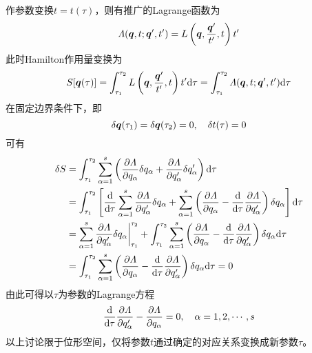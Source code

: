 作参数变换$t = t(\tau)$，则有推广的Lagrange函数为
\begin{equation*}
	\mathnormal{\Lambda} (\boldsymbol{q},t;\boldsymbol{q}',t') = L \left(\boldsymbol{q}, \frac{\boldsymbol{q}'}{t'},t\right) t'
\end{equation*}
此时Hamilton作用量变换为
\begin{equation}
	S[\boldsymbol{q}(\tau)] = \int_{\tau_1}^{\tau_2} L\left(\boldsymbol{q},\frac{\boldsymbol{q}'}{t'},t\right) t' \mathrm{d} \tau = \int_{\tau_1}^{\tau_2} \mathnormal{\Lambda} (\boldsymbol{q},t;\boldsymbol{q}',t') \mathrm{d} \tau
\end{equation}
在固定边界条件下，即
\begin{equation*}
	\delta \boldsymbol{q}(\tau_1) = \delta \boldsymbol{q}(\tau_2) = 0,\quad \delta t(\tau) = 0
\end{equation*}
可有
\begin{align*}
	\delta S & = \int_{\tau_1}^{\tau_2} \sum_{\alpha=1}^s \left(\frac{\partial \mathnormal{\Lambda}}{\partial q_\alpha} \delta q_\alpha + \frac{\partial \mathnormal{\Lambda}}{\partial q'_\alpha} \delta q'_\alpha\right) \mathrm{d} \tau \\
	& = \int_{\tau_1}^{\tau_2} \left[\frac{\mathrm{d}}{\mathrm{d} \tau} \sum_{\alpha=1}^s \frac{\partial \mathnormal{\Lambda}}{\partial q'_\alpha} \delta q_\alpha + \sum_{\alpha=1}^s \left(\frac{\partial \mathnormal{\Lambda}}{\partial q_\alpha} - \frac{\mathrm{d}}{\mathrm{d} \tau} \frac{\partial \mathnormal{\Lambda}}{\partial q'_\alpha}\right) \delta q_\alpha \right] \mathrm{d} \tau \\
	& = \sum_{\alpha=1}^s \frac{\partial \mathnormal{\Lambda}}{\partial q'_\alpha} \delta q_\alpha\bigg|_{\tau_1}^{\tau_2} + \int_{\tau_1}^{\tau_2} \sum_{\alpha=1}^s \left(\frac{\partial \mathnormal{\Lambda}}{\partial q_\alpha} - \frac{\mathrm{d}}{\mathrm{d} \tau} \frac{\partial \mathnormal{\Lambda}}{\partial q'_\alpha}\right) \delta q_\alpha \mathrm{d} \tau \\
	& = \int_{\tau_1}^{\tau_2} \sum_{\alpha=1}^s \left(\frac{\partial \mathnormal{\Lambda}}{\partial q_\alpha} - \frac{\mathrm{d}}{\mathrm{d} \tau} \frac{\partial \mathnormal{\Lambda}}{\partial q'_\alpha}\right) \delta q_\alpha \mathrm{d} \tau = 0
\end{align*}
由此可得以$\tau$为参数的Lagrange方程
\begin{equation}
	\frac{\mathrm{d}}{\mathrm{d} \tau} \frac{\partial \mathnormal{\Lambda}}{\partial q'_\alpha} - \frac{\partial \mathnormal{\Lambda}}{\partial q_\alpha} = 0,\quad \alpha = 1,2,\cdots,s
\end{equation}
以上讨论限于位形空间，仅将参数$t$通过确定的对应关系变换成新参数$\tau$。

